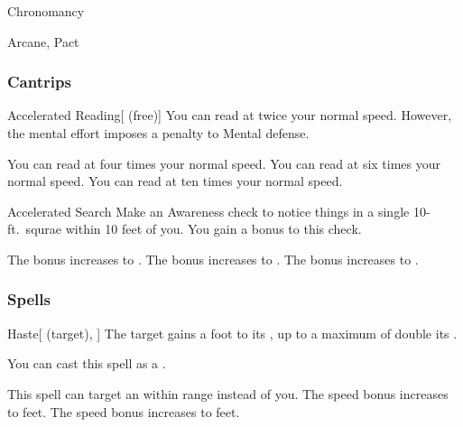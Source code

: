 \newpage
\begin{spellsection}{Chronomancy}

\begin{spellheader}
\end{spellheader}


 Arcane, Pact

\subsubsection{Cantrips}


\begin{freeability}{Accelerated Reading}[ (free)]
You can read at twice your normal speed.
However, the mental effort imposes a  penalty to Mental defense.

\rankline
{} You can read at four times your normal speed.
 You can read at six times your normal speed.
 You can read at ten times your normal speed.
\end{freeability}


\begin{freeability}{Accelerated Search}
Make an Awareness check to notice things in a single 10-ft.\ squrae within 10 feet of you.
You gain a  bonus to this check.

\rankline
{} The bonus increases to .
 The bonus increases to .
 The bonus increases to .
\end{freeability}

\end{spellsection}


\subsubsection{Spells}


\lowercase{\hypertarget{spell:Haste}{}}\label{spell:Haste}
\begin{attuneability}[Rank 1]{\hypertarget{spell:Haste}{Haste}}[ (target), ]
The target gains a  foot  to its , up to a maximum of double its .

You can cast this spell as a .

\rankline
{} This spell can target an  within \rngmed range instead of you.
 The speed bonus increases to  feet.
 The speed bonus increases to  feet.

\end{attuneability}
\vspace{0.25em}



